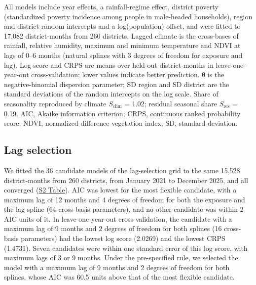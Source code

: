 \documentclass[11pt,a4paper]{article}
\begin{document}
\noindent All models include year effects, a rainfall-regime effect, district poverty (standardized poverty incidence among people in male-headed households), region and district random intercepts and a log(population) offset, and were fitted to 17,082 district-months from 260 districts. Lagged climate is the cross-bases of rainfall, relative humidity, maximum and minimum temperature and NDVI at lags of 0--6 months (natural splines with 3 degrees of freedom for exposure and lag). Log score and CRPS are means over held-out district-months in leave-one-year-out cross-validation; lower values indicate better prediction. θ is the negative-binomial dispersion parameter; SD region and SD district are the standard deviations of the random intercepts on the log scale. Share of seasonality reproduced by climate \(S_{\text{clim}}\) = 1.02; residual seasonal share \(S_{\text{res}}\) = 0.19. AIC, Akaike information criterion; CRPS, continuous ranked probability score; NDVI, normalized difference vegetation index; SD, standard deviation.\par\endgroup
\medskip

\subsection{Lag selection}

We fitted the 36 candidate models of the lag-selection grid to the same 15,528 district-months from 260 districts, from January 2021 to December 2025, and all converged (\hyperref[s2table]{S2 Table}). AIC was lowest for the most flexible candidate, with a maximum lag of 12 months and 4 degrees of freedom for both the exposure and the lag spline (64 cross-basis parameters), and no other candidate was within 2 AIC units of it. In leave-one-year-out cross-validation, the candidate with a maximum lag of 9 months and 2 degrees of freedom for both splines (16 cross-basis parameters) had the lowest log score (2.0269) and the lowest CRPS (1.4731). Seven candidates were within one standard error of this log score, with maximum lags of 3 or 9 months. Under the pre-specified rule, we selected the model with a maximum lag of 9 months and 2 degrees of freedom for both splines, whose AIC was 60.5 units above that of the most flexible candidate.
\end{document}
